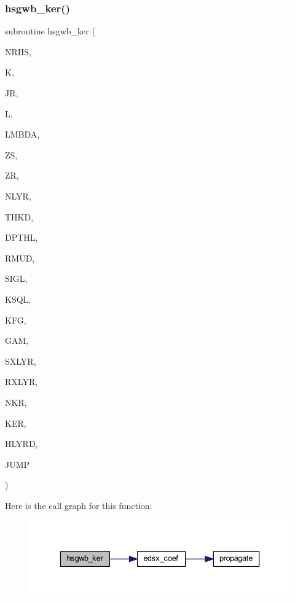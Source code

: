 \subsubsection{\texorpdfstring{hsgwb\+\_\+ker()}{hsgwb\_ker()}}
{\footnotesize\ttfamily subroutine hsgwb\+\_\+ker (\begin{DoxyParamCaption}\item[{integer}]{N\+R\+HS,  }\item[{integer}]{K,  }\item[{integer}]{JR,  }\item[{integer}]{L,  }\item[{real(kind=ql)}]{L\+M\+B\+DA,  }\item[{real(kind=ql)}]{ZS,  }\item[{real(kind=ql)}]{ZR,  }\item[{integer}]{N\+L\+YR,  }\item[{real(kind=ql), dimension (nlyr)}]{T\+H\+KD,  }\item[{real(kind=ql), dimension (nlyr)}]{D\+P\+T\+HL,  }\item[{real(kind=ql), dimension(0\+:nlyr)}]{R\+M\+UD,  }\item[{complex(kind=ql), dimension (nlyr)}]{S\+I\+GL,  }\item[{complex(kind=ql), dimension (nlyr)}]{K\+S\+QL,  }\item[{integer}]{K\+FG,  }\item[{integer}]{G\+AM,  }\item[{integer}]{S\+X\+L\+YR,  }\item[{integer}]{R\+X\+L\+YR,  }\item[{integer}]{N\+KR,  }\item[{complex(kind=ql), dimension(jnlo-\/nrhs\+:jnhi,nkr)}]{K\+ER,  }\item[{complex(kind=ql), dimension(nrhs,nkr)}]{H\+L\+Y\+RD,  }\item[{logical}]{J\+U\+MP }\end{DoxyParamCaption})}

Here is the call graph for this function\+:\nopagebreak
\begin{figure}[H]
\begin{center}
\leavevmode
\includegraphics[width=336pt]{Leroi__c_8f90_ad4730d65d0e42fe38f0f174339af3c71_cgraph}
\end{center}
\end{figure}
\mbox{\label{Leroi__c_8f90_a247cf958ed9d5aa90d05eee29e6a9582}} 
